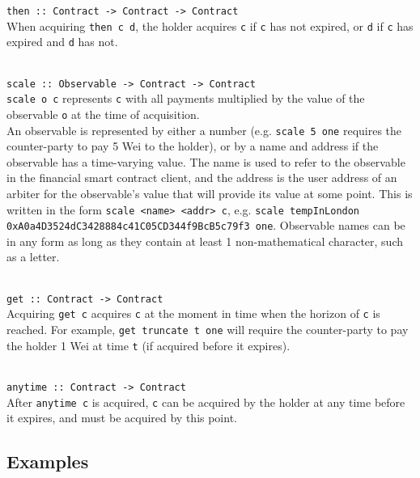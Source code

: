 \parbox{\textwidth}{
\texttt{then :: Contract -> Contract -> Contract} \\

When acquiring \texttt{then c d}, the holder acquires \texttt{c} if \texttt{c} has not expired, or \texttt{d} if \texttt{c} has expired and \texttt{d} has not. \\ \\
}

\parbox{\textwidth}{
\texttt{scale :: Observable -> Contract -> Contract} \\

\texttt{scale o c} represents \texttt{c} with all payments multiplied by the value of the observable \texttt{o} at the time of acquisition. \\

An observable is represented by either a number (e.g. \texttt{scale 5 one} requires the counter-party to pay 5 Wei to the holder), or by a name and address if the observable has a time-varying value. The name is used to refer to the observable in the financial smart contract client, and the address is the user address of an arbiter for the observable's value that will provide its value at some point. This is written in the form \texttt{scale <name> <addr> c}, e.g. \texttt{scale tempInLondon 0xA0a4D3524dC3428884c41C05CD344f9BcB5c79f3 one}. Observable names can be in any form as long as they contain at least 1 non-mathematical character, such as a letter. \\ \\
}

\parbox{\textwidth}{
\texttt{get :: Contract -> Contract} \\

Acquiring \texttt{get c} acquires \texttt{c} at the moment in time when the horizon of \texttt{c} is reached. For example, \texttt{get truncate t one} will require the counter-party to pay the holder 1 Wei at time \texttt{t} (if acquired before it expires). \\ \\
}

\parbox{\textwidth}{
\texttt{anytime :: Contract -> Contract} \\

After \texttt{anytime c} is acquired, \texttt{c} can be acquired by the holder at any time before it expires, and must be acquired by this point. \\
}


\subsection{Examples}

